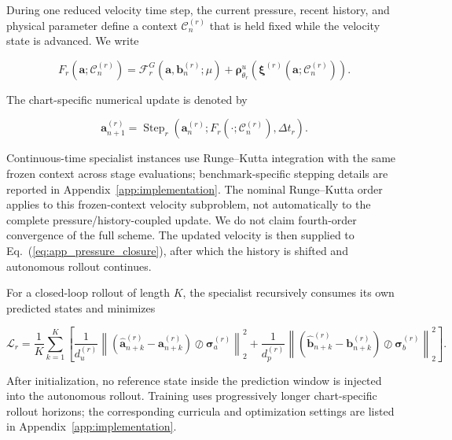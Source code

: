\documentclass{article}
\def\plaineqref#1{\ref{#1}}
\providecommand{\DIFaddtex}[1]{{\protect\color{blue} \sf #1}} %
\providecommand{\DIFaddbegin}{} %
\providecommand{\DIFaddend}{} %
\providecommand{\DIFadd}[1]{\texorpdfstring{\DIFaddtex{#1}}{#1}} %
\begin{document}
During one reduced velocity time step, the current pressure, recent history, and
physical parameter define a context $\mathcal C_n^{(r)}$ that is held fixed
while the velocity state is advanced. We write


\begin{equation}
  F_r
  \left(
    \bm a;\mathcal C_n^{(r)}
  \right)
  =
  \mathcal F_r^G
  \left(
    \bm a,\bm b_n^{(r)};\mu
  \right)
  +
  \bm\rho^u_{\theta_r}
  \left(
    \bm\xi^{(r)}
    \left(
      \bm a;\mathcal C_n^{(r)}
    \right)
  \right).
  \label{eq:app_frozen_context_rhs}
\end{equation}


The chart-specific numerical update is denoted by


\begin{equation}
  \bm a_{n+1}^{(r)}
  =
  \operatorname{Step}_r
  \left(
    \bm a_n^{(r)};
    F_r(\cdot;\mathcal C_n^{(r)}),
    \Delta t_r
  \right).
  \label{eq:app_specialist_step}
\end{equation}


Continuous-time specialist instances use Runge--Kutta integration with the
same frozen context across stage evaluations; benchmark-specific stepping
details are reported in Appendix~\ref{app:implementation}.
The \DIFaddbegin \DIFadd{nominal Runge--Kutta order applies to this frozen-context velocity subproblem, not automatically to the complete pressure/history-coupled update. We do not claim fourth-order convergence of the full scheme.
The }\DIFaddend updated velocity is then supplied to
Eq.~(\plaineqref{eq:app_pressure_closure}), after which the history is
shifted and autonomous rollout continues.

For a closed-loop rollout of length $K$, the specialist recursively
consumes its own predicted states and minimizes


\begin{equation}
  \mathcal L_r
  =
  \frac{1}{K}
  \sum_{k=1}^{K}
  \left[
    \frac{1}{d_u^{(r)}}
    \left\|
      \left(
        \widehat{\bm a}_{n+k}^{(r)}
        -
        \bm a_{n+k}^{(r)}
      \right)
      \oslash
      \bm\sigma_a^{(r)}
    \right\|_2^2
    +
    \frac{1}{d_p^{(r)}}
    \left\|
      \left(
        \widehat{\bm b}_{n+k}^{(r)}
        -
        \bm b_{n+k}^{(r)}
      \right)
      \oslash
      \bm\sigma_b^{(r)}
    \right\|_2^2
  \right].
  \label{eq:app_true_rollout_loss}
\end{equation}


After initialization, no reference state inside the prediction window is
injected into the autonomous rollout. Training uses progressively longer
chart-specific rollout horizons; the corresponding curricula and
optimization settings are listed in Appendix~\ref{app:implementation}.
\end{document}
